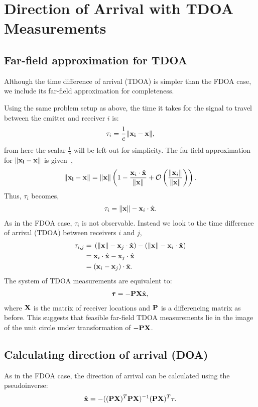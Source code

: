 \section{Direction of Arrival with TDOA Measurements}
\label{s:TDOA}
\subsection{Far-field approximation for TDOA}
Although the time difference of arrival (TDOA) is simpler than the FDOA case, we include its far-field approximation for completeness.

Using the same problem setup as above, the time it takes for the signal to travel between the emitter and receiver $i$ is:
\begin{align*}
  \tau_{i} = \frac{1}{c}\|\mathbf{x_i}-\mathbf{x}\|,
\end{align*}
from here the scalar $\frac{1}{c}$ will be left out for simplicity.
The far-field approximation for $\|\mathbf{x_i}-\mathbf{x}\|$ is given~\cite{Cheney2009},
\begin{align*}
  \|\mathbf{x_i}-\mathbf{x}\|=\|\mathbf{x}\|\left(1-\frac{\mathbf{x}_i\cdot\hat{\mathbf{x}}}{\|\mathbf{x}\|}+\mathcal{O}\left( \frac{\|\mathbf{x}_i\|}{\|\mathbf{x}\|}\right) \right).
\end{align*}
Thus, $\tau_{i}$ becomes,
\begin{align*}
  \tau_{i} = \|\mathbf{x}\| - \mathbf{x}_i\cdot\hat{\mathbf{x}}.
\end{align*}
As in the FDOA case, $\tau_i$ is not observable. Instead we look to the time difference of arrival (TDOA) between receivers $i$ and $j$,
\begin{align*}
  \tau_{i,j} =& \; \left(\|\mathbf{x}\| - \mathbf{x}_j\cdot\hat{\mathbf{x}}\right) - \left(\|\mathbf{x}\| - \mathbf{x}_i\cdot\hat{\mathbf{x}}\right) \\
            =& \; \mathbf{x}_i\cdot\hat{\mathbf{x}} - \mathbf{x}_j\cdot\hat{\mathbf{x}} \\
            =& \; (\mathbf{x}_i-\mathbf{x}_j)\cdot\hat{\mathbf{x}}.
\end{align*}
The system of TDOA measurements are equivalent to:
\begin{align}
  \pmb{\tau} = -\mathbf{PX}\hat{\mathbf{x}},
\end{align}
where $\mathbf{X}$ is the matrix of receiver locations and $\mathbf{P}$ is a differencing matrix as before. This suggests that feasible far-field TDOA measurements lie in the image of the unit circle under transformation of $-\mathbf{PX}$.

\subsection{Calculating direction of arrival (DOA)}
As in the FDOA case, the direction of arrival can be calculated using the pseudoinverse:
\begin{align}
    \label{eq:doa_t}
  \hat{\mathbf{x}} = -((\mathbf{PX})^T\mathbf{PX})^{-1}(\mathbf{PX})^T\mathbf{\tau}.
\end{align}
